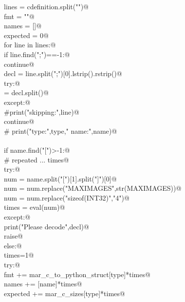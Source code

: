 \documentclass[10pt,a4paper,twoside,notitlepage]{article}
\begin{document}
\begin{flushleft}
\begin{minipage}{\linewidth}
\begin{list}{}{}
\mbox{}\verb@    lines = cdefinition.split("\n")@\\
\mbox{}\verb@    fmt = ""@\\
\mbox{}\verb@    names = []@\\
\mbox{}\verb@    expected = 0@\\
\mbox{}\verb@    for line in lines:@\\
\mbox{}\verb@        if line.find(";")==-1:@\\
\mbox{}\verb@            continue@\\
\mbox{}\verb@        decl  = line.split(";")[0].lstrip().rstrip()@\\
\mbox{}\verb@        try:@\\
\mbox{} = decl.split()@\\
\mbox{}\verb@        except:@\\
\mbox{}\verb@            #print("skipping:",line)@\\
\mbox{}\verb@            continue@\\
\mbox{}\verb@        #        print("type:",type,"  name:",name)@\\
\mbox{}\verb@@\\
\mbox{}\verb@        if name.find("[")>-1:@\\
\mbox{}\verb@            # repeated ... times@\\
\mbox{}\verb@            try:@\\
\mbox{}\verb@                num = name.split("[")[1].split("]")[0]@\\
\mbox{}\verb@                num = num.replace("MAXIMAGES",str(MAXIMAGES))@\\
\mbox{}\verb@                num = num.replace("sizeof(INT32)","4")@\\
\mbox{}\verb@                times = eval(num)@\\
\mbox{}\verb@            except:@\\
\mbox{}\verb@                print("Please decode",decl)@\\
\mbox{}\verb@                raise@\\
\mbox{}\verb@        else:@\\
\mbox{}\verb@            times=1@\\
\mbox{}\verb@        try:@\\
\mbox{}\verb@            fmt   += mar_c_to_python_struct[type]*times@\\
\mbox{}\verb@            names += [name]*times@\\
\mbox{}\verb@            expected += mar_c_sizes[type]*times@\\

\end{list}
\end{minipage}
\end{flushleft}
\end{document}
